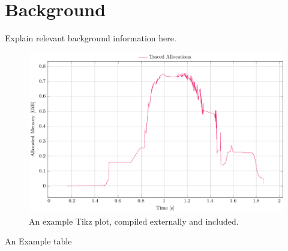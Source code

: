 \section{Background}\label{sec:background}

Explain relevant background information here.

\lipsum[6-8]

\begin{figure}
	\centering
	\includegraphics[width=\textwidth]{Graphics/example}
	\caption{An example Tikz plot, compiled externally and
	included.}\label{fig:example}
\end{figure}

\lipsum[9-11]

\begin{table}[t]
	\centering
	\caption{An Example table}\label{tab:example}
	
\end{table}
